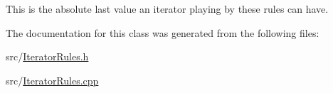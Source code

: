 This is the absolute last value an iterator playing by these rules can have. 

The documentation for this class was generated from the following files:\begin{DoxyCompactItemize}
\item 
src/\hyperlink{IteratorRules_8h}{IteratorRules.h}\item 
src/\hyperlink{IteratorRules_8cpp}{IteratorRules.cpp}\end{DoxyCompactItemize}
